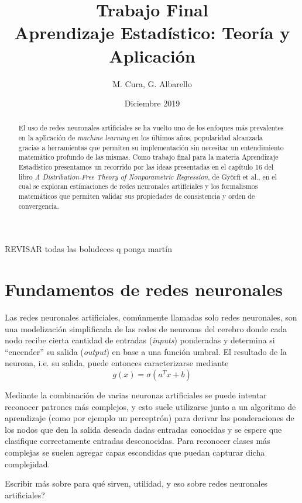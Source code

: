 \documentclass[12pt]{extarticle}
\title{Trabajo Final \\ Aprendizaje Estadístico: Teoría y Aplicación}
\author{M. Cura, G. Albarello}
\date{Diciembre 2019}
\newenvironment{comentarios_meta}
    {\begin{framed}\noindent\textcolor{red}{\textbf{//}}}
    {\end{framed}}
\begin{document}
\maketitle

\begin{comentarios_meta}
    REVISAR todas las boludeces q ponga martín
\end{comentarios_meta}

\begin{abstract}
    El uso de redes neuronales artificiales se ha vuelto uno de los enfoques más prevalentes en la aplicación de \textit{machine learning} en los últimos años, popularidad alcanzada gracias a herramientas que permiten su implementación sin necesitar un entendimiento matemático profundo de las mismas. Como trabajo final para la materia Aprendizaje Estadístico presentamos un recorrido por las ideas presentadas en el capítulo 16 del libro \textit{A Distribution-Free Theory of Nonparametric Regression}, de Györfi et al., en el cual se exploran estimaciones de redes neuronales artificiales y los formalismos matemáticos que permiten validar sus propiedades de consistencia y orden de convergencia.
\end{abstract}


\section{Fundamentos de redes neuronales}

    Las redes neuronales artificiales, comúnmente llamadas solo redes neuronales, son una modelización simplificada de las redes de neuronas del cerebro donde cada nodo recibe cierta cantidad de entradas (\textit{inputs}) ponderadas y determina si ``encender'' su salida (\textit{output}) en base a una función umbral. El resultado de la neurona, i.e. su salida, puede entonces caracterizarse mediante
    \begin{equation*}    
        g(x) = \sigma(a^T x + b)
    \end{equation*}

    Mediante la combinación de varias neuronas artificiales se puede intentar reconocer patrones más complejos, y esto suele utilizarse junto a un algoritmo de aprendizaje (como por ejemplo un perceptrón) para derivar las ponderaciones de los nodos que den la salida deseada dadas entradas conocidas y se espere que clasifique correctamente entradas desconocidas. Para reconocer clases más complejas se suelen agregar capas escondidas que puedan capturar dicha complejidad.
    \begin{comentarios_meta}
        Escribir más sobre para qué sirven, utilidad, y eso sobre redes neuronales artificiales?
    \end{comentarios_meta}
    
\end{document}
